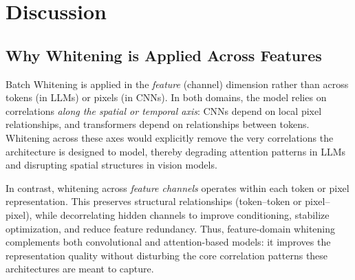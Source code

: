 \section{Discussion} \label{sec:discussion}


\subsection{Why Whitening is Applied Across Features}

Batch Whitening is applied in the \emph{feature} (channel) dimension rather than across tokens (in LLMs) or pixels (in CNNs).  
In both domains, the model relies on correlations \emph{along the spatial or temporal axis}:  
CNNs depend on local pixel relationships, and transformers depend on relationships between tokens.  
Whitening across these axes would explicitly remove the very correlations the architecture is designed to model, thereby degrading attention patterns in LLMs and disrupting spatial structures in vision models.

In contrast, whitening across \emph{feature channels} operates within each token or pixel representation.  
This preserves structural relationships (token–token or pixel–pixel), while decorrelating hidden channels to improve conditioning, stabilize optimization, and reduce feature redundancy.  
Thus, feature-domain whitening complements both convolutional and attention-based models: it improves the representation quality without disturbing the core correlation patterns these architectures are meant to capture.